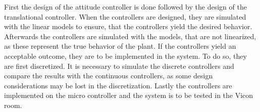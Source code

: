 First the design of the attitude controller is done followed by the design of the translational controller. 
When the controllers are designed, they are simulated with the linear models to ensure, that the controllers yield the desired behavior. Afterwards the controllers are simulated with the models, that are not linearized, as these represent the true behavior of the plant. If the controllers yield an acceptable outcome, they are to be implemented in the system. To do so, they are first discretized. It is necessary to simulate the discrete controllers and compare the results with the continuous controllers, as some design considerations may be lost in the discretization. Lastly the controllers are implemented on the micro controller and the system is to be tested in the Vicon room. 